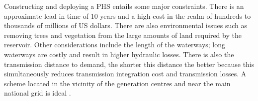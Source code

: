 
Constructing and deploying a PHS entails some major
constraints. There is an approximate lead in time of 10 years and a high cost
in the realm of hundreds to thousands of millions of US dollars. There are also
environmental issues such as removing trees and vegetation from the large
amounts of land required by the reservoir. Other considerations include the
length of the waterways; long waterways are costly and result in higher
hydraulic losses. There is also the transmission distance to demand, the
shorter this distance the better because this simultaneously reduces
transmission integration cost and transmission losses. A scheme located in the
vicinity of the generation centres and near the main national grid is
ideal \citep{Louwinger2008}.

%
%





